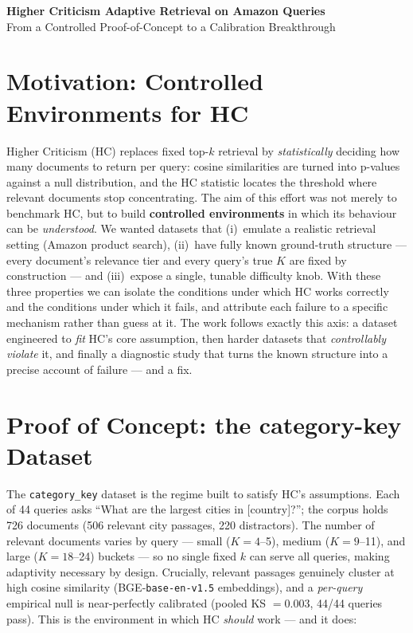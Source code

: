 \documentclass[11pt]{article}
\begin{document}
\begin{center}
{\LARGE \textbf{Higher Criticism Adaptive Retrieval on Amazon Queries}} \\[6pt]
{\large From a Controlled Proof-of-Concept to a Calibration Breakthrough}
\end{center}

\vspace{4pt}

\section{Motivation: Controlled Environments for HC}

Higher Criticism (HC) replaces fixed top-$k$ retrieval by \emph{statistically}
deciding how many documents to return per query: cosine similarities are turned
into p-values against a null distribution, and the HC statistic locates the
threshold where relevant documents stop concentrating. The aim of this effort
was not merely to benchmark HC, but to build \textbf{controlled environments}
in which its behaviour can be \emph{understood}. We wanted datasets that
(i)~emulate a realistic retrieval setting (Amazon product search),
(ii)~have fully known ground-truth structure --- every document's relevance
tier and every query's true $K$ are fixed by construction --- and
(iii)~expose a single, tunable difficulty knob. With these three properties
we can isolate the conditions under which HC works correctly and the conditions
under which it fails, and attribute each failure to a specific mechanism rather
than guess at it. The work follows exactly this axis: a dataset engineered to
\emph{fit} HC's core assumption, then harder datasets that \emph{controllably
violate} it, and finally a diagnostic study that turns the known structure into
a precise account of failure --- and a fix.

\section{Proof of Concept: the category-key Dataset}

The \texttt{category\_key} dataset is the regime built to satisfy HC's
assumptions. Each of 44 queries asks ``What are the largest cities in
[country]?''; the corpus holds 726 documents (506 relevant city passages,
220 distractors). The number of relevant documents varies by query --- small
($K\!=\!4$--5), medium ($K\!=\!9$--11), and large ($K\!=\!18$--24) buckets ---
so no single fixed $k$ can serve all queries, making adaptivity necessary by
design. Crucially, relevant passages genuinely cluster at high cosine
similarity (BGE-\texttt{base-en-v1.5} embeddings), and a \emph{per-query}
empirical null is near-perfectly calibrated (pooled KS $=0.003$, 44/44 queries
pass). This is the environment in which HC \emph{should} work --- and it does:
\end{document}
